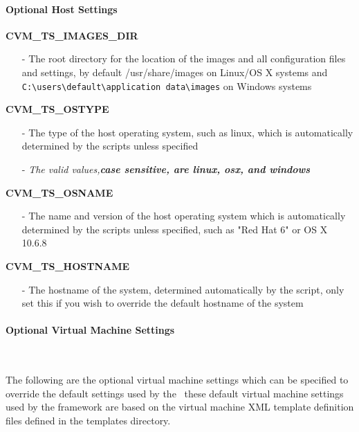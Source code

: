 \paragraph*{Optional Host Settings}
\begin{description}
\item {\bf CVM\_TS\_IMAGES\_DIR}
		\begin{itemize}
		\item[-]	The root directory for the location of the \cernvm images and all
				configuration files and settings, by default /usr/share/images on
				Linux/OS X systems and \verb|C:\users\default\application data\images|
				on Windows systems
		\end{itemize}

\item {\bf CVM\_TS\_OSTYPE}
		\begin{itemize}
		\item[-]	The type of the host operating system, such as linux,  which is automatically 
					determined by the scripts unless specified
		\item[-]	\emph{The valid values,\bf{case sensitive}, are linux, osx, and windows}
		\end{itemize}

\item {\bf CVM\_TS\_OSNAME}
		\begin{itemize}
		\item[-]	The name and version of the host operating system which is automatically determined by
					the scripts unless specified, such as "Red Hat 6" or OS X 10.6.8
		\end{itemize}
		
\item {\bf CVM\_TS\_HOSTNAME}
		\begin{itemize}
		\item[-]	The hostname of the system, determined automatically by the script,
				only set this if you wish to override the default hostname of the
				system
		\end{itemize}
\end{description}


\paragraph*{Optional Virtual Machine Settings}~\newline

The following are the optional virtual machine settings which can be specified to override
the default settings used by the \cernvmtestframework\, these default virtual machine settings
used by the framework are based on the virtual machine XML template definition files defined
in the templates directory.
 
